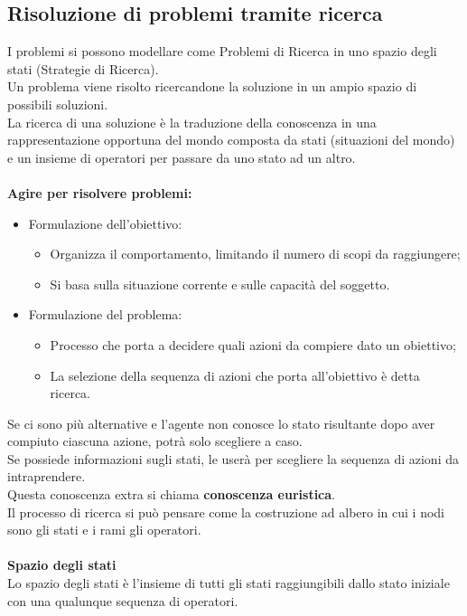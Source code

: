 \documentclass[../main.tex]{subfiles}
\begin{document}
	\subsection{Risoluzione di problemi tramite ricerca}
	I problemi si possono modellare come Problemi di Ricerca in uno spazio degli stati (Strategie di Ricerca).\\
	Un problema viene risolto ricercandone la soluzione in un ampio spazio di possibili soluzioni.\\
	La ricerca di una soluzione è la traduzione della conoscenza in una rappresentazione opportuna del mondo composta da stati (situazioni del mondo) e un insieme di operatori per passare da uno stato ad un altro.\\ \\
	\textbf{Agire per risolvere problemi:}
	\begin{itemize}
		\item Formulazione dell’obiettivo:
		\begin{itemize}
			\item Organizza il comportamento, limitando il numero di scopi da raggiungere;
			\item Si basa sulla situazione corrente e sulle capacità del soggetto.
		\end{itemize}
		\item Formulazione del problema:
		\begin{itemize}
			\item Processo che porta a decidere quali azioni da compiere dato un obiettivo;
			\item La selezione della sequenza di azioni che porta all'obiettivo è detta ricerca.
		\end{itemize}
	\end{itemize}
	Se ci sono più alternative e l’agente non conosce lo stato risultante dopo aver compiuto ciascuna azione, potrà solo scegliere a caso.\\
	Se possiede informazioni sugli stati, le userà per scegliere la sequenza di azioni da intraprendere.\\
	Questa conoscenza extra si chiama \textbf{conoscenza euristica}.\\
	Il processo di ricerca si può pensare come la costruzione ad albero in cui i nodi sono gli stati e i rami gli operatori.\\ \\
	\textbf{Spazio degli stati}\\
	Lo spazio degli stati è l’insieme di tutti gli stati raggiungibili dallo stato iniziale con una qualunque sequenza di operatori.\\
\end{document}
